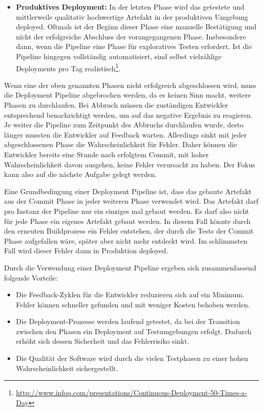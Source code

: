 \begin{itemize}
	\item \textbf{Produktives Deployment:} In der letzten Phase wird das getestete und mittlerweile qualitativ hochwertige Artefakt in der produktiven Umgebung deployed. Oftmals ist der Beginn dieser Phase eine manuelle Bestätigung und nicht der erfolgreiche Abschluss der vorangegangenen Phase. Insbesondere dann, wenn die Pipeline eine Phase für exploratives Testen erfordert. Ist die Pipeline hingegen vollständig automatisiert, sind selbst vielzählige Deployments pro Tag realistisch\footnote{\url{http://www.infoq.com/presentations/Continuous-Deployment-50-Times-a-Day}}.
\end{itemize}

Wenn eine der oben genannten Phasen nicht erfolgreich abgeschlossen wird, muss die Deployment Pipeline abgebrochen werden, da es keinen Sinn macht, weitere Phasen zu durchlaufen. Bei Abbruch müssen die zuständigen Entwickler entsprechend benachrichtigt werden, um auf das negative Ergebnis zu reagieren. Je weiter die Pipeline zum Zeitpunkt des Abbruchs durchlaufen wurde, desto länger mussten die Entwickler auf Feedback warten. Allerdings sinkt mit jeder abgeschlossenen Phase die Wahrscheinlichkeit für Fehler. Daher können die Entwickler bereits eine Stunde nach erfolgtem Commit, mit hoher Wahrscheinlichkeit davon ausgehen, keine Fehler verursacht zu haben. Der Fokus kann also auf die nächste Aufgabe gelegt werden.

Eine Grundbedingung einer Deployment Pipeline ist, dass das gebaute Artefakt aus der Commit Phase in jeder weiteren Phase verwendet wird. Das Artefakt darf pro Instanz der Pipeline nur ein einziges mal gebaut werden. Es darf also nicht für jede Phase ein eigenes Artefakt gebaut werden. In diesem Fall könnte durch den erneuten Buildprozess ein Fehler entstehen, der durch die Tests der Commit Phase aufgefallen wäre, später aber nicht mehr entdeckt wird. Im schlimmsten Fall wird dieser Fehler dann in Produktion deployed. 

Durch die Verwendung einer Deployment Pipeline ergeben sich zusammenfassend folgende Vorteile:
\begin{itemize}
	\item Die Feedback-Zyklen für die Entwickler reduzieren sich auf ein Minimum. Fehler können schneller gefunden und mit weniger Kosten behoben werden.
	\item Die Deployment-Prozesse werden laufend getestet, da bei der Transition zwischen den Phasen ein Deployment auf Testumgebungen erfolgt. Dadurch erhöht sich dessen Sicherheit und das Fehlerrisiko sinkt.
	\item Die Qualität der Software wird durch die vielen Testphasen zu einer hohen Wahrscheinlichkeit sichergestellt.
\end{itemize}

